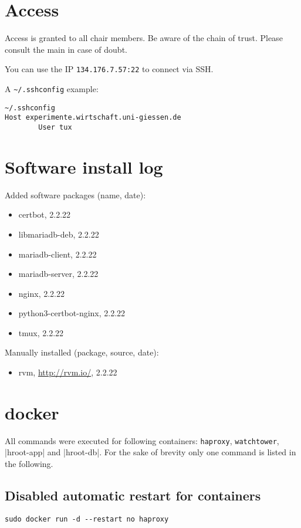 \documentclass{article}
\begin{document}
\section{Access}
Access is granted to all chair members. Be aware of the chain of trust. Please consult the main in case of doubt.

You can use the IP \verb|134.176.7.57:22| to connect via SSH.

A \verb|~/.sshconfig| example:
\begin{lstlisting}
~/.sshconfig
Host experimente.wirtschaft.uni-giessen.de                                        
        User tux
\end{lstlisting}

\section{Software install log}
Added software packages (name, date):
\begin{itemize}
    \item certbot, 2.2.22
    \item libmariadb-deb, 2.2.22
    \item mariadb-client, 2.2.22
    \item mariadb-server, 2.2.22
    \item nginx, 2.2.22
    \item python3-certbot-nginx, 2.2.22
    \item tmux, 2.2.22
\end{itemize}

Manually installed (package, source, date):
\begin{itemize}
    \item rvm, \url{http://rvm.io/}, 2.2.22
\end{itemize}

\section{docker}

All commands were executed for following containers: \verb|haproxy|, \verb|watchtower|, |hroot-app| and |hroot-db|. For the sake of brevity only one command is listed in the following.

\subsection{Disabled automatic restart for containers}

\begin{lstlisting}
sudo docker run -d --restart no haproxy
\end{lstlisting}
\end{document}
